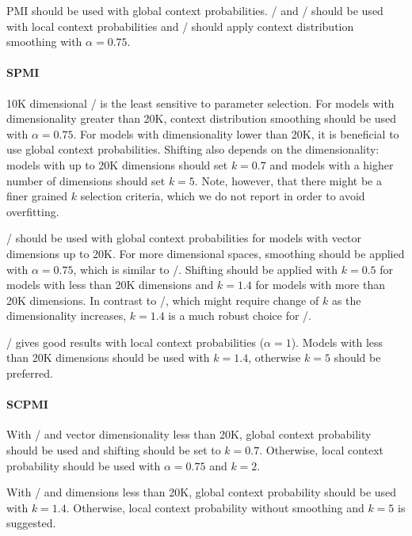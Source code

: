 \documentclass[11pt]{article}
\begin{document}
PMI should be used with global context probabilities. \NCPMI/ and \logNCPMI/ should be used with local context probabilities and \CPMI/ should apply context distribution smoothing with $\alpha = 0.75$.

\paragraph{SPMI}

10K dimensional \SPMI/ is the least sensitive to parameter selection. For models with dimensionality greater than 20K, context distribution smoothing should be used with $\alpha = 0.75$. For models with dimensionality lower than 20K, it is beneficial to use global context probabilities. Shifting also depends on the dimensionality: models with up to 20K dimensions should set $k = 0.7$ and models with a higher number of dimensions should set $k = 5$. Note, however, that there might be a finer grained $k$ selection criteria, which we do not report in order to avoid overfitting.



\logNSPMI/ should be used with global context probabilities for models with vector dimensions up to 20K. For more dimensional spaces, smoothing should be applied with $\alpha = 0.75$, which is similar to \SPMI/. Shifting should be applied with $k = 0.5$ for models with less than 20K dimensions and $k = 1.4$ for models with more than 20K dimensions. In contrast to \SPMI/, which might require change of $k$ as the dimensionality increases, $k = 1.4$ is a much robust choice for \logNSPMI/.

\NSPMI/ gives good results with local context probabilities ($\alpha = 1$). Models with less than 20K dimensions should be used with $k = 1.4$, otherwise $k = 5$ should be preferred.

\paragraph{SCPMI}

With \SCPMI/ and vector dimensionality less than 20K, global context probability should be used and shifting should be set to $k = 0.7$. Otherwise, local context probability should be used with $\alpha = 0.75$ and $k = 2$.

With \NSCPMI/ and dimensions less than 20K, global context probability should be used with $k = 1.4$. Otherwise, local context probability without smoothing and $k = 5$ is suggested.
\end{document}
